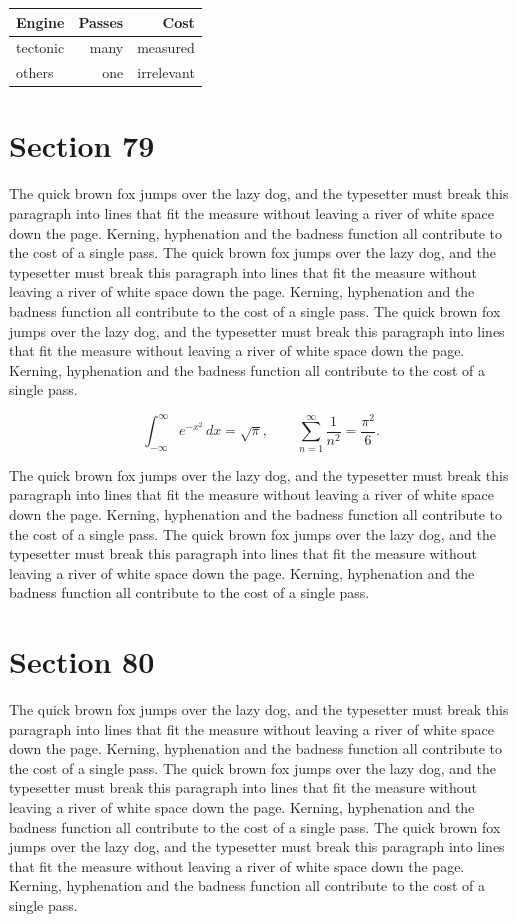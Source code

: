\documentclass{article}
\begin{document}
\begin{center}
\begin{tabular}{lrr}
\toprule
Engine & Passes & Cost \\
\midrule
tectonic & many & measured \\
others & one & irrelevant \\
\bottomrule
\end{tabular}
\end{center}

\section{Section 79}
The quick brown fox jumps over the lazy dog, and the typesetter must break this paragraph into lines that fit the measure without leaving a river of white space down the page. Kerning, hyphenation and the badness function all contribute to the cost of a single pass. The quick brown fox jumps over the lazy dog, and the typesetter must break this paragraph into lines that fit the measure without leaving a river of white space down the page. Kerning, hyphenation and the badness function all contribute to the cost of a single pass. The quick brown fox jumps over the lazy dog, and the typesetter must break this paragraph into lines that fit the measure without leaving a river of white space down the page. Kerning, hyphenation and the badness function all contribute to the cost of a single pass. 

\begin{equation}
\int_{-\infty}^{\infty} e^{-x^{2}}\,dx = \sqrt{\pi}, \qquad
\sum_{n=1}^{\infty} \frac{1}{n^{2}} = \frac{\pi^{2}}{6}.
\end{equation}

The quick brown fox jumps over the lazy dog, and the typesetter must break this paragraph into lines that fit the measure without leaving a river of white space down the page. Kerning, hyphenation and the badness function all contribute to the cost of a single pass. The quick brown fox jumps over the lazy dog, and the typesetter must break this paragraph into lines that fit the measure without leaving a river of white space down the page. Kerning, hyphenation and the badness function all contribute to the cost of a single pass. 
\section{Section 80}
The quick brown fox jumps over the lazy dog, and the typesetter must break this paragraph into lines that fit the measure without leaving a river of white space down the page. Kerning, hyphenation and the badness function all contribute to the cost of a single pass. The quick brown fox jumps over the lazy dog, and the typesetter must break this paragraph into lines that fit the measure without leaving a river of white space down the page. Kerning, hyphenation and the badness function all contribute to the cost of a single pass. The quick brown fox jumps over the lazy dog, and the typesetter must break this paragraph into lines that fit the measure without leaving a river of white space down the page. Kerning, hyphenation and the badness function all contribute to the cost of a single pass. 
\end{document}
